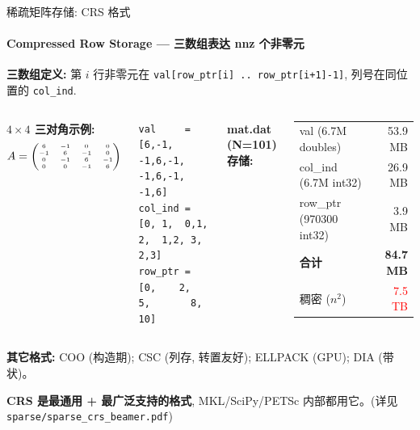 \documentclass[12pt,aspectratio=169]{beamer}
\begin{document}
\begin{frame}{稀疏矩阵存储: CRS 格式}
\framesubtitle{Compressed Row Storage — 三数组表达 nnz 个非零元}

\footnotesize
\textbf{三数组定义:} 第 $i$ 行非零元在 \texttt{val[row\_ptr[i] .. row\_ptr[i+1]-1]}, 列号在同位置的 \texttt{col\_ind}.

\vspace{2pt}
\begin{columns}[T]
\textbf{$4\times 4$ 三对角示例:}
\[\tiny
A = \begin{pmatrix} 6 & -1 & 0 & 0 \\ -1 & 6 & -1 & 0 \\ 0 & -1 & 6 & -1 \\ 0 & 0 & -1 & 6 \end{pmatrix}
\]

\begin{lstlisting}[basicstyle=\ttfamily\scriptsize,belowskip=-2pt,aboveskip=0pt,numbers=none]
val     = [6,-1, -1,6,-1, -1,6,-1, -1,6]
col_ind = [0, 1,  0,1, 2,  1,2, 3,  2,3]
row_ptr = [0,    2,       5,       8,  10]
\end{lstlisting}

\textbf{mat.dat (N=101) 存储:}

\scriptsize
\begin{tabular}{@{}l r@{}}
\toprule
val (6.7M doubles)     & 53.9 MB \\
col\_ind (6.7M int32)  & 26.9 MB \\
row\_ptr (970300 int32) & 3.9 MB \\
\textbf{合计}           & \textbf{84.7 MB} \\
稠密 ($n^2$)            & \textcolor{red}{7.5 TB} \\
\bottomrule
\end{tabular}
\end{columns}

\vspace{4pt}
\textbf{其它格式:} COO (构造期); CSC (列存, 转置友好); ELLPACK (GPU); DIA (带状)。

\textbf{CRS 是最通用 + 最广泛支持的格式}, MKL/SciPy/PETSc 内部都用它。(详见 \texttt{sparse/sparse\_crs\_beamer.pdf})
\end{frame}
\end{document}
